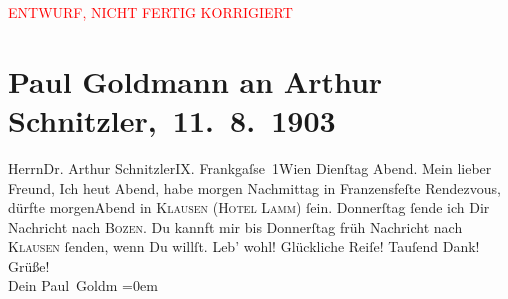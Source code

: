 
\begin{center}
            \textcolor{red}{ENTWURF, NICHT FERTIG KORRIGIERT}
                      \end{center}
            
         \renewcommand{\erwaehnteOrte}{Orte: Bozen, Frankgasse, Franzensfeste, Gasthof zum Lamm, Klausen (Südtirol), Wien}
         \renewcommand{\erwaehnteWerke}{}
               \section[ Paul Goldmann an Arthur Schnitzler, 11. 8. 1903]{ Paul Goldmann an Arthur Schnitzler, 11. 8. 1903}\nopagebreak{}\rehead{ }\begin{ledgroupsized}[t]{13cm}\normalsize\beginnumbering \toendnotes[C]{\smallbreak\pagebreak[2]} 
\toendnotes[C]{\smallbreak}\pstart{}{\pb}Herrn\pend{}\pstart{}Dr. Arthur Schnitzler\pend{}\pstart{}IX. Frankgaſse 1Wien\pend{}{\bigskip}\pstart
           {\pb}Dienſtag{ }Abend.\pend
           \pstart{}Mein lieber Freund,\pend\pstart
           Ich \label{K_L03383-1v}\label{K_L03383-1h}{ }heut{ }Abend, habe morgen{ }Nachmittag in Franzensfeſte
               Rendezvous, dürfte morgenAbend in \textsc{Klausen} (\textsc{Hotel Lamm}) ſein. Donnerſtag ſende ich Dir Nachricht nach
                  \textsc{Bozen}. Du kannft mir bis Donnerſtag{ }früh Nachricht nach \textsc{Klausen} ſenden, wenn Du willſt.\pend
           \pstart
           Leb’ wohl! Glückliche Reiſe! Tauſend Dank! Grüße! {\\[\baselineskip]}Dein \spacefill\mbox{Paul
                  Goldm}\pend
           \leftskip=0em{}
         
         \endnumbering{}\end{ledgroupsized}\begin{anhang}\end{anhang}\newcommand{\dateiname}{L03383}\newcommand{\titel}{Paul Goldmann an Arthur Schnitzler, 11. 8. 1903}\newcommand{\editorInnen}{Martin Anton Müller und Laura Untner}
      